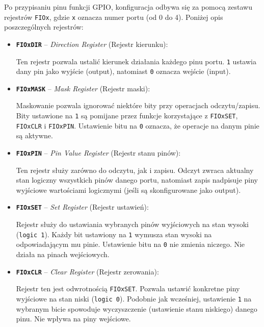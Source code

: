 Po przypisaniu pinu funkcji GPIO, konfiguracja odbywa się za pomocą zestawu rejestrów \texttt{FIOx}, gdzie \texttt{x} oznacza numer portu (od 0 do 4). Poniżej opis poszczególnych rejestrów:

\begin{itemize}
    \item \textbf{\texttt{FIOxDIR}} – \textit{Direction Register} (Rejestr kierunku):

    Ten rejestr pozwala ustalić kierunek działania każdego pinu portu. 
    \texttt{1} ustawia dany pin jako wyjście (output), natomiast \texttt{0} oznacza wejście (input). 


    \item \textbf{\texttt{FIOxMASK}} – \textit{Mask Register} (Rejestr maski):

    Maskowanie pozwala ignorować niektóre bity przy operacjach odczytu/zapisu. 
    Bity ustawione na \texttt{1} są pomijane przez funkcje korzystające z \texttt{FIOxSET}, \texttt{FIOxCLR} i \texttt{FIOxPIN}. 
    Ustawienie bitu na \texttt{0} oznacza, że operacje na danym pinie są aktywne.


    \item \textbf{\texttt{FIOxPIN}} – \textit{Pin Value Register} (Rejestr stanu pinów):

    Ten rejestr służy zarówno do odczytu, jak i zapisu. 
    Odczyt zwraca aktualny stan logiczny wszystkich pinów danego portu, natomiast zapis nadpisuje piny wyjściowe wartościami logicznymi (jeśli są skonfigurowane jako output).


    \item \textbf{\texttt{FIOxSET}} – \textit{Set Register} (Rejestr ustawień):

    Rejestr służy do ustawiania wybranych pinów wyjściowych na stan wysoki (\texttt{logic 1}). 
    Każdy bit ustawiony na \texttt{1} wymusza stan wysoki na odpowiadającym mu pinie. 
    Ustawienie bitu na \texttt{0} nie zmienia niczego. Nie działa na pinach wejściowych.


    \item \textbf{\texttt{FIOxCLR}} – \textit{Clear Register} (Rejestr zerowania):

    Rejestr ten jest odwrotnością \texttt{FIOxSET}. Pozwala ustawić konkretne piny wyjściowe na stan niski (\texttt{logic 0}). 
    Podobnie jak wcześniej, ustawienie \texttt{1} na wybranym bicie spowoduje wyczyszczenie (ustawienie stanu niskiego) danego pinu. 
    Nie wpływa na piny wejściowe.

\end{itemize}




